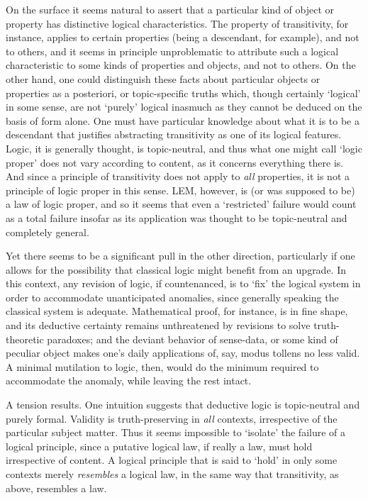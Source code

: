 On the surface it seems natural to assert that a particular kind of object or property has distinctive logical characteristics. The property of transitivity, for instance, applies to certain properties (being a descendant, for example), and not to others, and it seems in principle unproblematic to attribute such a logical characteristic to some kinds of properties and objects, and not to others. On the other hand, one could distinguish these facts about particular objects or properties as a posteriori, or topic-specific truths which, though certainly `logical' in some sense, are not `purely' logical inasmuch as they cannot be deduced on the basis of form alone. One must have particular knowledge about what it is to be a descendant that justifies abstracting transitivity as one of its logical features. Logic, it is generally thought, is topic-neutral, and thus what one might call `logic proper' does not vary according to content, as it concerns everything there is. And since a principle of transitivity does not apply to \emph{all} properties, it is not a principle of logic proper in this sense. LEM, however, is (or was supposed to be) a law of logic proper, and so it seems that even a `restricted' failure would count as a total failure insofar as its application was thought to be topic-neutral and completely general.

Yet there seems to be a significant pull in the other direction, particularly if one allows for the possibility that classical logic might benefit from an upgrade. In this context, any revision of logic, if countenanced, is to `fix' the logical system in order to accommodate unanticipated anomalies, since generally speaking the classical system is adequate. Mathematical proof, for instance, is in fine shape, and its deductive certainty remains unthreatened by revisions to solve truth-theoretic paradoxes; and the deviant behavior of sense-data, or some kind of peculiar object makes one's daily applications of, say, modus tollens no less valid. A minimal mutilation to logic, then, would do the minimum required to accommodate the anomaly, while leaving the rest intact.

A tension results. One intuition suggests that deductive logic is topic-neutral and purely formal. Validity is truth-preserving in \emph{all} contexts, irrespective of the particular subject matter. Thus it seems impossible to `isolate' the failure of a logical principle, since a putative logical law, if really a law, must hold irrespective of content. A logical principle that is said to `hold' in only some contexts merely \emph{resembles} a logical law, in the same way that transitivity, as above, resembles a law.

